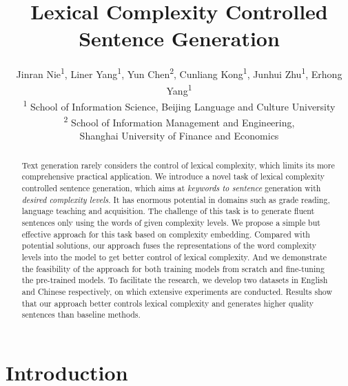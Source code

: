 \documentclass[11pt]{article}
\title{Lexical Complexity Controlled Sentence Generation}
\author{
    Jinran Nie\textsuperscript{1},
    Liner Yang\textsuperscript{1}, 
    Yun Chen\textsuperscript{2},
    Cunliang Kong\textsuperscript{1},
    Junhui Zhu\textsuperscript{1},
    Erhong Yang\textsuperscript{1} \\
    \textsuperscript{1} School of Information Science, Beijing Language and Culture University \\
    \textsuperscript{2} School of Information Management and Engineering, \\ Shanghai University of Finance and Economics
}
\begin{document}
\maketitle
\begin{abstract}
Text generation rarely considers the control of lexical complexity, which limits its more comprehensive practical application. We introduce a novel task of lexical complexity controlled sentence generation, which aims at \textit{keywords to sentence} generation with \textit{desired complexity levels}. It has enormous potential in domains such as grade reading, language teaching and acquisition. The challenge of this task is to generate fluent sentences only using the words of given complexity levels. We propose a simple but effective approach for this task based on complexity embedding. Compared with potential solutions, our approach fuses the representations of the word complexity levels into the model to get better control of lexical complexity. And we demonstrate the feasibility of the approach for both training models from scratch and fine-tuning the pre-trained models. To facilitate the research, we develop two datasets in English and Chinese respectively, on which extensive experiments are conducted. Results show that our approach better controls lexical complexity and generates higher quality sentences than baseline methods.
\end{abstract}

\section{Introduction}
\end{document}
